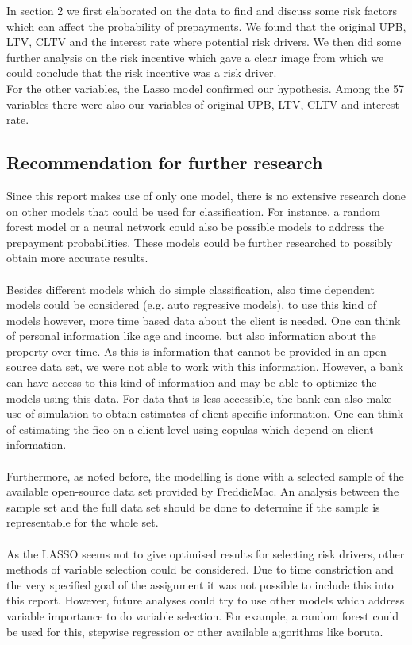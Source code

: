 
In section 2 we first elaborated on the data to find and discuss some risk factors which can affect the probability of prepayments. We found that the original UPB, LTV, CLTV and the interest rate where potential risk drivers. We then did some further analysis on the risk incentive which gave a clear image from which we could conclude that the risk incentive was a risk driver. \\
For the other variables, the Lasso model confirmed our hypothesis. Among the 57 variables there were also our variables of original UPB, LTV, CLTV and interest rate. 


\subsection{Recommendation for further research}
    Since this report makes use of only one model, there is no 
    extensive research done on other models that could be 
    used for classification. For instance, a random forest 
    model or a neural network could also be possible models 
    to address the prepayment probabilities. These models 
    could be further researched to possibly obtain more accurate 
    results. 
    \\\\
    Besides different models which do simple classification, 
    also time dependent models could be considered (e.g.
    auto regressive models), to use this kind of models 
    however, more time based data about the client is 
    needed. One can think of personal information like age
    and income, but also information about the property over 
    time. As this is information that cannot be provided in 
    an open source data set, we were not able to work with 
    this information. However, a bank can have access to 
    this kind of information and may be able to optimize
    the models using this data.
    For data that is less accessible, the bank can also 
    make use of simulation to obtain estimates of client 
    specific information. One can think of estimating the 
    fico on a client level using copulas which depend
    on client information.
    \\\\
    Furthermore, as noted before, the modelling is done 
    with a selected sample of the available open-source 
    data set provided by FreddieMac. An analysis between 
    the sample set and the full data set should be done 
    to determine if the sample is representable for the 
    whole set. 
    \\\\ 
    As the LASSO seems not to give optimised results for 
    selecting risk drivers, other methods of variable 
    selection could be considered. Due to time constriction and the very specified goal of the assignment 
    it was not possible to include this into this report. 
    However, future analyses could try to use other models which
    address variable importance to do variable selection. 
    For example, a random forest could be used for this, stepwise regression or other available a;gorithms like boruta. 